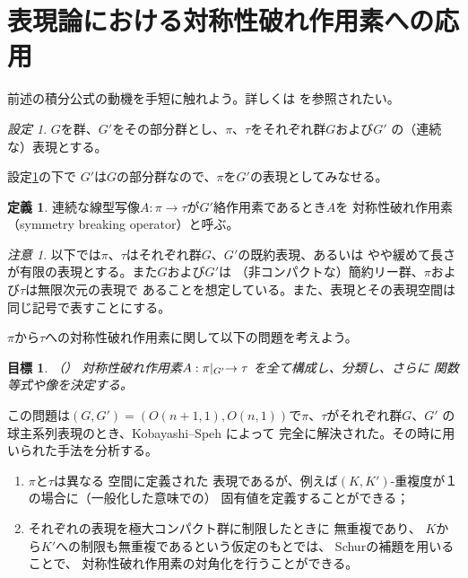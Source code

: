 \documentclass[12pt,a4paper,dvipdfmx]{jsarticle}
\numberwithin{equation}{section}
\theoremstyle{jplain}
\newtheorem*{goal*}{目標}
\theoremstyle{remark}
\newtheorem{remark}[thm]{注意}
\newtheorem{setting}[thm]{設定}
\theoremstyle{definition}
\newtheorem{definition}[thm]{定義}
\newcommand{\mykana}[2]{#1}
\begin{document}
{\section{表現論における対称性破れ作用素への応用}
前述の積分公式の動機を手短に触れよう。詳しくは\cite{kobayashi2015program,kobayashi2015symmetry}
を参照されたい。
	\begin{setting}\label{set:1}
		$G$を群、$G'$をその部分群とし、$\pi$、$\tau$をそれぞれ群$G$および$G'$
		の（連続な）表現とする。
	\end{setting}
	設定\ref{set:1}の下で
	$G'$は$G$の部分群なので、$\pi$を$G'$の表現としてみなせる。
	\begin{definition}
		連続な線型写像$A:\pi\to\tau$が$G'$絡作用素であるとき$A$を
		対称性破れ作用素（symmetry breaking operator）と呼ぶ。
	\end{definition}
	\centerline{
		\xymatrixcolsep{0.5pc}
		\xymatrixrowsep{1pc}
		}
	\begin{remark}
		以下では$\pi$、$\tau$はそれぞれ群$G$、$G'$の既約表現、あるいは
		やや{緩}めて長さが有限の表現とする。また$G$および$G'$は
		（非コンパクトな）簡約リー群、$\pi$および$\tau$は無限次元の表現で
		あることを想定している。また、表現とその表現空間は同じ記号で表すことにする。
	\end{remark}
$\pi$から$\tau$への対称性破れ作用素に関して以下の問題を考えよう。
\begin{goal*}（\cite{kobayashi2015program}）
		対称性破れ作用素${A:\pi\kern-0.1cm\mid_{G'}\to\tau}$
		を全て構成し、分類し、さらに
		関数等式や像を決定する。
	\end{goal*}
	この問題は$(G,G')=(O(n+1,1),O(n,1))$で$\pi$、$\tau$がそれぞれ群$G$、$G'$
	の球主系列表現のとき、Kobayashi--Speh \cite{kobayashi2015symmetry}によって
	完全に解決された。その時に用いられた手法を分析する。
	\begin{enumerate}
		\item $\pi$と$\tau$は異なる
			空間に定義された
			表現であるが、例えば$(K,K')$-重複度が１の場合に（一般化した意味での）
			固有値を定義することができる；
		\item
それぞれの表現を極大コンパクト群に制限したときに
無重複であり、
$K$から$K'$への制限も無重複であるという仮定のもとでは、
Schurの補題を用いることで、
対称性破れ作用素の\mykana{対角化}{タイカクカ}を行うことができる。


\end{enumerate}}
\end{document}
